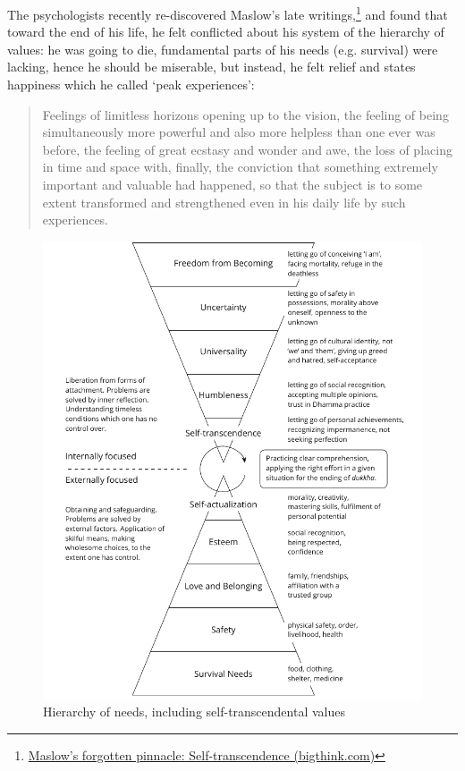 The psychologists recently re-discovered Maslow's late
writings,\footnote{\href{https://bigthink.com/neuropsych/maslow-self-transcendence/}{Maslow's
  forgotten pinnacle: Self-transcendence (bigthink.com)}} and found that
toward the end of his life, he felt conflicted about his system of the
hierarchy of values: he was going to die, fundamental parts of his needs
(e.g. survival) were lacking, hence he should be miserable, but instead,
he felt relief and states happiness which he called `peak experiences':

\begin{quote}
Feelings of limitless horizons opening up to the vision, the feeling of
being simultaneously more powerful and also more helpless than one ever
was before, the feeling of great ecstasy and wonder and awe, the loss of
placing in time and space with, finally, the conviction that something
extremely important and valuable had happened, so that the subject is to
some extent transformed and strengthened even in his daily life by such
experiences.
\end{quote}

\clearpage
\figurepagelayout

\begin{figure}[h]
\caption{Hierarchy of needs, including self-transcendental values}\label{fig-self-transcendental}
\bigskip
\includegraphics[width=\linewidth]{./manuscript/tex/diagrams/self-transcendental-values.pdf}
\end{figure}

